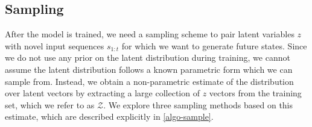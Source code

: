 \documentclass{article}
\begin{document}

\subsection{Sampling} \label{sec:sampling}

After the model is trained, we need a sampling scheme to pair latent variables $z$ with novel input sequences $s_{1:t}$ for which we want to generate future states.
Since we do not use any prior on the latent distribution during training, we cannot assume the latent distribution follows a known parametric form which we can sample from.
Instead, we obtain a non-parametric estimate of the distribution over latent vectors by extracting a large collection of $z$ vectors from the training set, which we refer to as $\mathcal{Z}$.
We explore three sampling methods based on this estimate, which are described explicitly in \cref{algo-sample}.

\end{document}
